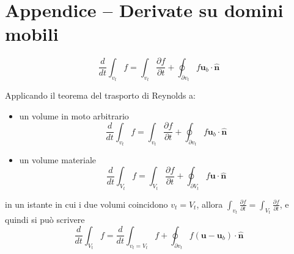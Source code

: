 \chapter{Appendice -- Derivate su domini mobili}
\begin{theorem}
\begin{equation}
    \dfrac{d}{dt} \int_{v_t} f = \int_{v_t} \dfrac{\partial f}{\partial t} + \oint_{\partial v_t} f \mathbf{u}_b \cdot \mathbf{\hat{n}}
\end{equation}
\end{theorem}
Applicando il teorema del trasporto di Reynolds a:
\begin{itemize}
    \item un volume in moto arbitrario
\begin{equation}
    \dfrac{d}{dt} \int_{v_t} f = \int_{v_t} \dfrac{\partial f}{\partial t} + \oint_{\partial v_t} f \mathbf{u}_b \cdot \mathbf{\hat{n}}
\end{equation}
    \item un volume materiale
\begin{equation}
    \dfrac{d}{dt} \int_{V_t} f = \int_{V_t} \dfrac{\partial f}{\partial t} + \oint_{\partial V_t} f \mathbf{u} \cdot \mathbf{\hat{n}}
\end{equation}
\end{itemize}
in un istante in cui i due volumi coincidono $v_t = V_t$, allora $\int_{v_t} \frac{\partial f}{\partial t} = \int_{V_t} \frac{\partial f}{\partial t}$, e quindi si può scrivere
\begin{equation}
    \dfrac{d}{dt} \int_{V_t} f = \dfrac{d}{dt} \int_{v_t = V_t} f + \oint_{\partial v_t} f ( \mathbf{u} - \mathbf{u}_b ) \cdot \mathbf{\hat{n}}
\end{equation}

